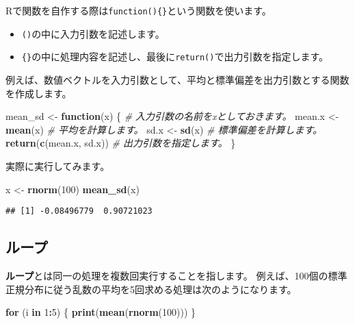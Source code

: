 \documentclass[]{bxjsarticle}
\newenvironment{Shaded}{\begin{snugshade}}{\end{snugshade}}
\newcommand{\CommentTok}[1]{\textcolor[rgb]{0.56,0.35,0.01}{\textit{#1}}}
\newcommand{\ControlFlowTok}[1]{\textcolor[rgb]{0.13,0.29,0.53}{\textbf{#1}}}
\newcommand{\DecValTok}[1]{\textcolor[rgb]{0.00,0.00,0.81}{#1}}
\newcommand{\KeywordTok}[1]{\textcolor[rgb]{0.13,0.29,0.53}{\textbf{#1}}}
\newcommand{\NormalTok}[1]{#1}
\newcommand{\OperatorTok}[1]{\textcolor[rgb]{0.81,0.36,0.00}{\textbf{#1}}}
\newcommand{\StringTok}[1]{\textcolor[rgb]{0.31,0.60,0.02}{#1}}
\providecommand{\tightlist}{%
  \setlength{\itemsep}{0pt}\setlength{\parskip}{0pt}}
\begin{document}
Rで関数を自作する際は\texttt{function()\{\}}という関数を使います。

\begin{itemize}
\tightlist
\item
  \texttt{()}の中に入力引数を記述します。
\item
  \texttt{\{\}}の中に処理内容を記述し、最後に\texttt{return()}で出力引数を指定します。
\end{itemize}

例えば、数値ベクトルを入力引数として、平均と標準偏差を出力引数とする関数を作成します。

\begin{Shaded}
\begin{Highlighting}[]
\NormalTok{mean_sd <-}\StringTok{ }\ControlFlowTok{function}\NormalTok{(x) \{ }\CommentTok{# 入力引数の名前をxとしておきます。}
\NormalTok{  mean.x <-}\StringTok{ }\KeywordTok{mean}\NormalTok{(x) }\CommentTok{# 平均を計算します。}
\NormalTok{  sd.x <-}\StringTok{ }\KeywordTok{sd}\NormalTok{(x) }\CommentTok{# 標準偏差を計算します。}
  \KeywordTok{return}\NormalTok{(}\KeywordTok{c}\NormalTok{(mean.x, sd.x)) }\CommentTok{# 出力引数を指定します。}
\NormalTok{\}}
\end{Highlighting}
\end{Shaded}

実際に実行してみます。

\begin{Shaded}
\begin{Highlighting}[]
\NormalTok{x <-}\StringTok{ }\KeywordTok{rnorm}\NormalTok{(}\DecValTok{100}\NormalTok{)}
\KeywordTok{mean_sd}\NormalTok{(x)}
\end{Highlighting}
\end{Shaded}

\begin{verbatim}
## [1] -0.08496779  0.90721023
\end{verbatim}

\hypertarget{ux30ebux30fcux30d7}{%
\subsection{ループ}\label{ux30ebux30fcux30d7}}

\textbf{ループ}とは同一の処理を複数回実行することを指します。
例えば、100個の標準正規分布に従う乱数の平均を5回求める処理は次のようになります。

\begin{Shaded}
\begin{Highlighting}[]
\ControlFlowTok{for}\NormalTok{ (i }\ControlFlowTok{in} \DecValTok{1}\OperatorTok{:}\DecValTok{5}\NormalTok{) \{}
  \KeywordTok{print}\NormalTok{(}\KeywordTok{mean}\NormalTok{(}\KeywordTok{rnorm}\NormalTok{(}\DecValTok{100}\NormalTok{)))}
\NormalTok{\}}
\end{Highlighting}
\end{Shaded}
\end{document}
